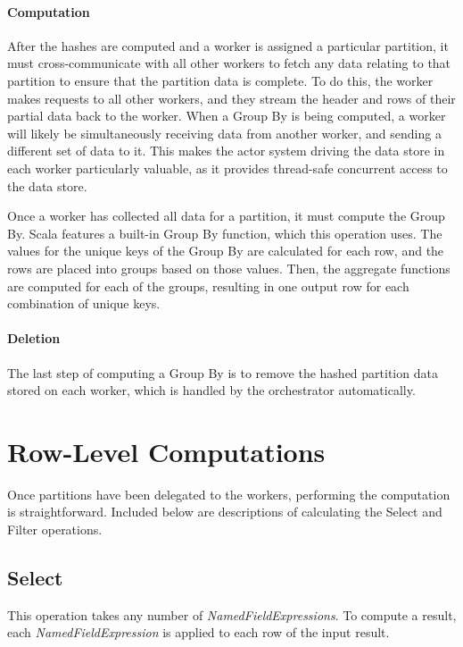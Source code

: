 \paragraph{Computation}
After the hashes are computed and a worker is assigned a particular partition, it must cross-communicate with all other workers to fetch any data relating to that partition to ensure that the partition data is complete. To do this, the worker makes requests to all other workers, and they stream the header and rows of their partial data back to the worker. When a Group By is being computed, a worker will likely be simultaneously receiving data from another worker, and sending a different set of data to it. This makes the actor system driving the data store in each worker particularly valuable, as it provides thread-safe concurrent access to the data store.

Once a worker has collected all data for a partition, it must compute the Group By. Scala features a built-in Group By function, which this operation uses. The values for the unique keys of the Group By are calculated for each row, and the rows are placed into groups based on those values. Then, the aggregate functions are computed for each of the groups, resulting in one output row for each combination of unique keys. 

\paragraph{Deletion}
The last step of computing a Group By is to remove the hashed partition data stored on each worker, which is handled by the orchestrator automatically.



\section{Row-Level Computations}
Once partitions have been delegated to the workers, performing the computation is straightforward. Included below are descriptions of calculating the Select and Filter operations.

\subsection{Select} 
This operation takes any number of \textit{NamedFieldExpressions}. To compute a result, each \textit{NamedFieldExpression} is applied to each row of the input result. 

